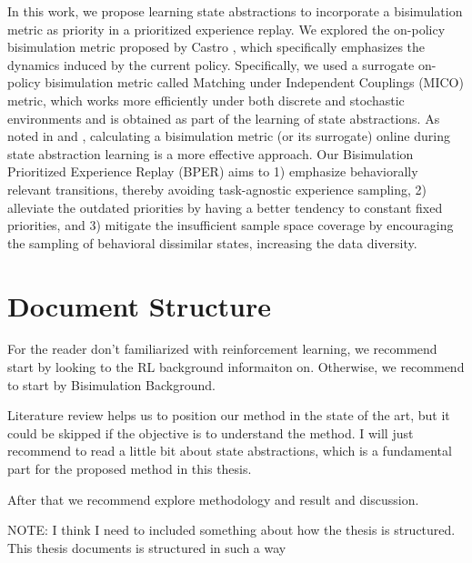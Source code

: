 In this work, we propose learning state abstractions to incorporate a bisimulation metric as priority in a prioritized experience replay. We explored the on-policy bisimulation metric proposed by Castro \cite{castro2020scalable}, which specifically emphasizes the dynamics induced by the current policy. Specifically, we used a surrogate on-policy bisimulation metric called Matching under Independent Couplings (MICO) \cite{castro2021mico} metric, which works more efficiently under both discrete and stochastic environments and is obtained as part of the learning of state abstractions. As noted in \cite{zhang2020learning} and \cite{castro2021mico}, calculating a bisimulation metric (or its surrogate) online during state abstraction learning is a more effective approach. Our Bisimulation Prioritized Experience Replay (BPER) aims to 1) emphasize behaviorally relevant transitions, thereby avoiding task-agnostic experience sampling, 2) alleviate the outdated priorities by having a better tendency to constant fixed priorities, and 
3) mitigate the insufficient sample space coverage by encouraging the sampling of behavioral dissimilar states, increasing the data diversity.

\section{Document Structure}

For the reader don't familiarized with reinforcement learning, we recommend start by looking to the RL background informaiton on. Otherwise, we recommend to start by Bisimulation Background.

Literature review helps us to position our method in the state of the art, but it could be skipped if the objective is to understand the method. I will just recommend to read a little bit about state abstractions, which is a fundamental part for the proposed method in this thesis.

After that we recommend explore methodology and result and discussion.


NOTE: I think I need to included something about how the thesis is structured.
This thesis documents is structured in such a way 


